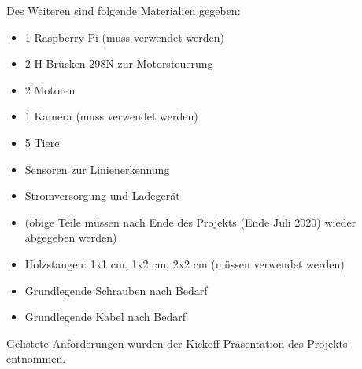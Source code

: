 Des Weiteren sind folgende Materialien gegeben:

\begin{itemize}
    \item 1 Raspberry-Pi (muss verwendet werden)
    \item 2 H-Brücken 298N zur Motorsteuerung
    \item 2 Motoren
    \item 1 Kamera (muss verwendet werden)
    \item 5 Tiere
    \item Sensoren zur Linienerkennung
    \item Stromversorgung und Ladegerät
    \item (obige Teile müssen nach Ende des Projekts (Ende Juli 2020) wieder abgegeben werden)
    \item Holzstangen: 1x1 cm, 1x2 cm, 2x2 cm (müssen verwendet werden)
    \item Grundlegende Schrauben nach Bedarf
    \item Grundlegende Kabel nach Bedarf 
\end{itemize}

Gelistete Anforderungen wurden der Kickoff-Präsentation des Projekts entnommen.
